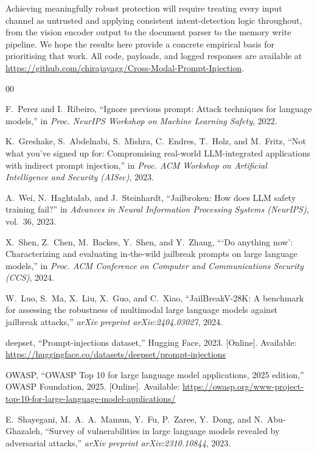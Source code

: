 \documentclass[conference]{IEEEtran}
\begin{document}
Achieving meaningfully robust protection will require treating every input channel as untrusted and applying consistent intent-detection logic throughout, from the vision encoder output to the document parser to the memory write pipeline. We hope the results here provide a concrete empirical basis for prioritising that work. All code, payloads, and logged responses are available at \url{https://github.com/chirajayagg/Cross-Modal-Prompt-Injection}.

\begin{thebibliography}{00}

F.~Perez and I.~Ribeiro, ``Ignore previous prompt: Attack techniques for language models,'' in \textit{Proc. NeurIPS Workshop on Machine Learning Safety}, 2022.

K.~Greshake, S.~Abdelnabi, S.~Mishra, C.~Endres, T.~Holz, and M.~Fritz, ``Not what you've signed up for: Compromising real-world LLM-integrated applications with indirect prompt injection,'' in \textit{Proc. ACM Workshop on Artificial Intelligence and Security (AISec)}, 2023.

A.~Wei, N.~Haghtalab, and J.~Steinhardt, ``Jailbroken: How does LLM safety training fail?'' in \textit{Advances in Neural Information Processing Systems (NeurIPS)}, vol.~36, 2023.

X.~Shen, Z.~Chen, M.~Backes, Y.~Shen, and Y.~Zhang, ```Do anything now': Characterizing and evaluating in-the-wild jailbreak prompts on large language models,'' in \textit{Proc. ACM Conference on Computer and Communications Security (CCS)}, 2024.

W.~Luo, S.~Ma, X.~Liu, X.~Guo, and C.~Xiao, ``JailBreakV-28K: A benchmark for assessing the robustness of multimodal large language models against jailbreak attacks,'' \textit{arXiv preprint arXiv:2404.03027}, 2024.

deepset, ``Prompt-injections dataset,'' Hugging Face, 2023. [Online]. Available: \url{https://huggingface.co/datasets/deepset/prompt-injections}

OWASP, ``OWASP Top 10 for large language model applications, 2025 edition,'' OWASP Foundation, 2025. [Online]. Available: \url{https://owasp.org/www-project-top-10-for-large-language-model-applications/}

E.~Shayegani, M.~A.~A.~Mamun, Y.~Fu, P.~Zaree, Y.~Dong, and N.~Abu-Ghazaleh, ``Survey of vulnerabilities in large language models revealed by adversarial attacks,'' \textit{arXiv preprint arXiv:2310.10844}, 2023.


\end{thebibliography}
\end{document}

